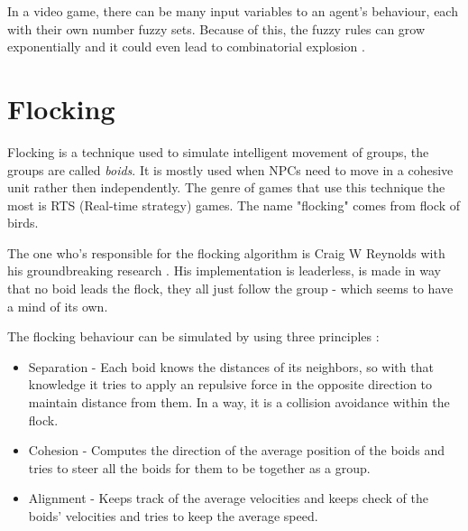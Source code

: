 \documentclass[a4paper, 12pt]{book}
\begin{document}
In a video game, there can be many input variables to an agent's behaviour, each with their own number fuzzy sets. Because of this, the fuzzy rules can grow exponentially and it could even lead to combinatorial explosion \cite{CombinatorialBombing}.

\section{Flocking}

Flocking is a technique used to simulate intelligent movement of groups, the groups are called \emph{boids}. It is mostly used when NPCs need to move in a cohesive unit rather then independently. The genre of games that use this technique the most is RTS (Real-time strategy) games. The name "flocking" comes from flock of birds.

The one who's responsible for the flocking algorithm is Craig W Reynolds with his groundbreaking research \cite{FlocksReynolds}. His implementation is leaderless, is made in way that no boid leads the flock, they all just follow the group - which seems to have a mind of its own.

The flocking behaviour can be simulated by using three principles \cite{FlockingBehaviour}: 
\begin{itemize}
    \item Separation - Each boid knows the distances of its neighbors, so with that knowledge it tries to apply an repulsive force in the opposite direction to maintain distance from them. In a way, it is a collision avoidance within the flock.
    \item Cohesion - Computes the direction of the average position of the boids and tries to steer all the boids for them to be together as a group.
    \item Alignment - Keeps track of the average velocities and keeps check of the boids' velocities and tries to keep the average speed.
\end{itemize}
\end{document}
